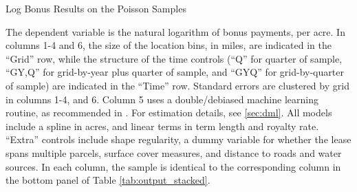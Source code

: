\documentclass[12pt]{article}
\begin{document}
\begin{appendices}
\begin{table}[H]
	\begin{center}
	\begin{threeparttable}
	\caption{Log Bonus Results on the Poisson Samples}
	\label{tab:log_revenues}
	\small
	            
		\begin{tablenotes}
		\footnotesize
		\item The dependent variable is the natural logarithm of bonus payments, per acre.  In columns 1-4 and 6, the size of the location bins, in miles, are indicated in the ``Grid'' row, while the structure of the time controls (``Q'' for quarter of sample, ``GY,Q'' for grid-by-year plus quarter of sample, and ``GYQ'' for grid-by-quarter of sample) are indicated in the ``Time'' row.  Standard errors are clustered by grid in columns 1-4, and 6.  Column 5 uses a double/debiased machine learning routine, as recommended in  \cite{chernozhukov2018double}.  For estimation details, see \ref{sec:dml}.  All models include a spline in acres, and linear terms in term length and royalty rate.  ``Extra'' controls include shape regularity, a dummy variable for whether the lease spans multiple parcels, surface cover measures, and distance to roads and water sources.  In each column, the sample is identical to the corresponding column in the bottom panel of Table \ref{tab:output_stacked}.      
		\end{tablenotes}	   
	\end{threeparttable}
	\end{center}
\end{table}


\end{appendices}
\end{document}
